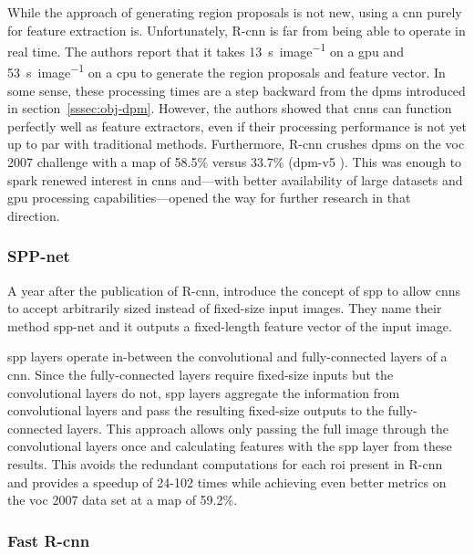 \documentclass[final]{vutinfth} %
\begin{document}
While the approach of generating region proposals is not new, using a
\gls{cnn} purely for feature extraction is. Unfortunately, R-\gls{cnn}
is far from being able to operate in real time. The authors report
that it takes \qty{13}{\s\per image} on a \gls{gpu} and
\qty{53}{\s\per image} on a \gls{cpu} to generate the region proposals
and feature vector. In some sense, these processing times are a step
backward from the \glspl{dpm} introduced in
section~\ref{sssec:obj-dpm}. However, the authors showed that
\glspl{cnn} can function perfectly well as feature extractors, even if
their processing performance is not yet up to par with traditional
methods. Furthermore, R-\gls{cnn} crushes \glspl{dpm} on the \gls{voc}
2007 challenge with a \gls{map} of 58.5\% \cite{girshick2014} versus
33.7\% (\gls{dpm}-v5 \cite{girshick,felzenszwalb2010}). This was
enough to spark renewed interest in \glspl{cnn} and—with better
availability of large datasets and \gls{gpu} processing
capabilities—opened the way for further research in that direction.

\subsubsection{SPP-net}
\label{sssec:theory-spp-net}

A year after the publication of R-\gls{cnn}, \textcite{he2015}
introduce the concept of \gls{spp} to allow \glspl{cnn} to accept
arbitrarily sized instead of fixed-size input images. They name their
method \gls{spp}-net and it outputs a fixed-length feature vector of
the input image.

\gls{spp} layers operate in-between the convolutional and
fully-connected layers of a \gls{cnn}. Since the fully-connected
layers require fixed-size inputs but the convolutional layers do not,
\gls{spp} layers aggregate the information from convolutional layers
and pass the resulting fixed-size outputs to the fully-connected
layers. This approach allows only passing the full image through the
convolutional layers once and calculating features with the \gls{spp}
layer from these results. This avoids the redundant computations for
each \gls{roi} present in R-\gls{cnn} and provides a speedup of 24-102
times while achieving even better metrics on the \gls{voc} 2007 data
set at a \gls{map} of 59.2\%.

\subsubsection{Fast R-\gls{cnn}}
\label{sssec:theory-fast-rcnn}
\end{document}
